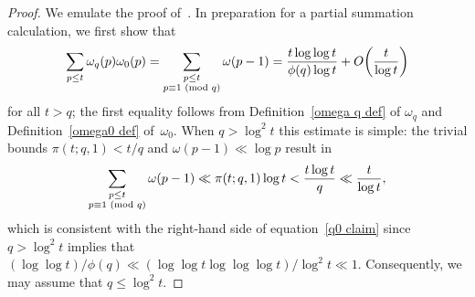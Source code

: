 \documentclass[12pt,reqno]{amsart}
\theoremstyle{definition}
\renewcommand{\mod}[1]{{\ifmmode\text{\rm\ (mod~$#1$)}\else\discretionary{}{}{\hbox{ }}\rm(mod~$#1$)\fi}}
\begin{document}
\begin{proof}
We emulate the proof of~\cite[Lemma 2.1]{ep85}. In preparation for a partial summation calculation, we first show that
\begin{equation}  \label{q0 claim}
\sum_{p \leq t} \omega_q(p) \omega_0(p) = \sum_{\substack{p \leq t \\ p \equiv 1 \mod q}} \omega(p-1) = \frac{t\log\log t}{\phi(q)\log t} + O\bigg(\frac{t}{\log t}\bigg)
\end{equation}
for all $t>q$; the first equality follows from Definition~\ref{omega q def} of $\omega_q$ and Definition~\ref{omega0 def} of~$\omega_0$. When $q>\log^2 t$ this estimate is simple: the trivial bounds $\pi(t;q,1) < t/q$ and $\omega(p-1) \ll \log p$ result in
\[
\sum_{\substack{p \leq t \\ p \equiv 1 \mod q}} \omega(p-1) \ll \pi(t;q,1) \log t < \frac{t\log t}q \ll \frac t{\log t},
\]
which is consistent with the right-hand side of equation~\eqref{q0 claim} since $q>\log^2t$ implies that $(\log\log t)/ \phi(q) \ll (\log\log t \log\log\log t)/\log^2 t \ll 1$. Consequently, we may assume that $q \le \log^2t$.


\end{proof}
\end{document}
